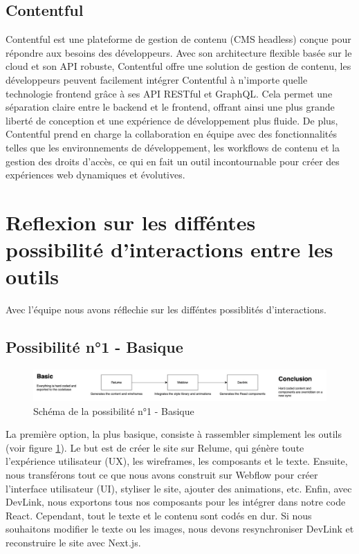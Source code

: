 \subsection{Contentful}
Contentful est une plateforme de gestion de contenu (CMS headless) conçue pour répondre aux besoins des développeurs. Avec son architecture flexible basée sur le cloud et son API robuste, Contentful offre une solution de gestion de contenu, les développeurs peuvent facilement intégrer Contentful à n'importe quelle technologie frontend grâce à ses API RESTful et GraphQL. Cela permet une séparation claire entre le backend et le frontend, offrant ainsi une plus grande liberté de conception et une expérience de développement plus fluide. De plus, Contentful prend en charge la collaboration en équipe avec des fonctionnalités telles que les environnements de développement, les workflows de contenu et la gestion des droits d'accès, ce qui en fait un outil incontournable pour créer des expériences web dynamiques et évolutives.

\section{Reflexion sur les difféntes possibilité d'interactions entre les outils}
Avec l'équipe nous avons réflechie sur les difféntes possiblités d'interactions.

\subsection{Possibilité n°1 - Basique}
\begin{figure}[h] 
  \centering
  \includegraphics[width=1\textwidth]{Includes/Images/connection1.png}
  \caption{Schéma de la possibilité n°1 - Basique}
  \label{fig: Schéma de la possibilité n°1 - Basique}
\end{figure} 
La première option, la plus basique, consiste à rassembler simplement les outils (voir figure \ref{fig: Schéma de la possibilité n°1 - Basique}). Le but est de créer le site sur Relume, qui génère toute l'expérience utilisateur (UX), les wireframes, les composants et le texte. Ensuite, nous transférons tout ce que nous avons construit sur Webflow pour créer l'interface utilisateur (UI), styliser le site, ajouter des animations, etc. Enfin, avec DevLink, nous exportons tous nos composants pour les intégrer dans notre code React. Cependant, tout le texte et le contenu sont codés en dur. Si nous souhaitons modifier le texte ou les images, nous devons resynchroniser DevLink et reconstruire le site avec Next.js.

